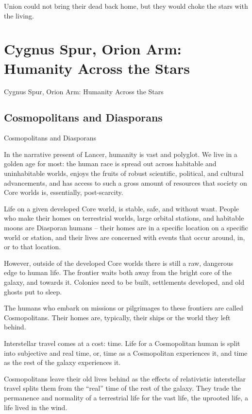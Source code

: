 Union could not bring their dead back home, but they would choke the stars with the living.

\section{Cygnus Spur, Orion Arm: Humanity Across the Stars}

Cygnus Spur, Orion Arm: Humanity
Across the Stars

\subsection{Cosmopolitans and Diasporans}
Cosmopolitans and Diasporans

In the narrative present of Lancer, humanity is vast and polyglot. We live in a golden age
for most: the human race is spread out across habitable and uninhabitable worlds, enjoys the
fruits of robust scientific, political, and cultural advancements, and has access to such a gross
amount of resources that society on Core worlds is, essentially, post-scarcity.


Life on a given developed Core world, is stable, safe, and without want. People who make their
homes on terrestrial worlds, large orbital stations, and habitable moons are Diasporan humans --
their homes are in a specific location on a specific world or station, and their lives are concerned
with events that occur around, in, or to that location.


However, outside of the developed Core worlds there is still a raw, dangerous edge to human life.
The frontier waits both away from the bright core of the galaxy, and towards it. Colonies need to
be built, settlements developed, and old ghosts put to sleep.


The humans who embark on missions or pilgrimages to these frontiers are called Cosmopolitans.
Their homes are, typically, their ships or the world they left behind.


Interstellar travel comes at a cost: time. Life for a Cosmopolitan human is split into subjective
and real time, or, time as a Cosmopolitan experiences it, and time as the rest of the galaxy
experiences it.


Cosmopolitans leave their old lives behind as the effects of relativistic interstellar travel splits
them from the “real” time of the rest of the galaxy. They trade the permanence and normality of a
terrestrial life for the vast life, the uprooted life, a life lived in the wind.


